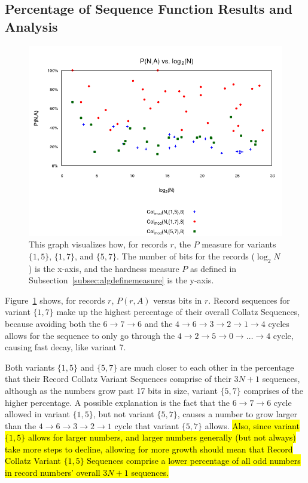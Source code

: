 \subsection{Percentage of Sequence Function Results and Analysis} \label{subsubsec:algmulpercentage}
\begin{figure}
    \centering
    \includegraphics[scale=0.6]{ModAvoidanceAnalysisPics/P_vs_log_multi_base.png}
    \caption{This graph visualizes how, for records $r$, the $P$ measure for variants $\{1,5\}$, $\{1,7\}$, and $\{5,7\}$. The number of bits for the records ($\log_2{N}$) is the x-axis, and the hardness measure $P$ as defined in Subsection~\ref{subsec:algdefinemeasure} is the y-axis.}
    \label{fig:p_multi_vslog}
\end{figure}
Figure~\ref{fig:p_multi_vslog} shows, for records $r$, $P(r,A)$ versus bits in $r$. Record sequences for variant $\{1,7\}$ make up the highest percentage of their overall Collatz Sequences, because avoiding both the $6 \rightarrow 7 \rightarrow 6$ and the $4 \rightarrow 6 \rightarrow 3 \rightarrow 2 \rightarrow 1 \rightarrow 4$ cycles allows for the sequence to only go through the $4  \rightarrow 2 \rightarrow 5 \rightarrow 0 \rightarrow \ldots \rightarrow 4$ cycle, causing fast decay, like variant 7. \par
Both variants $\{1,5\}$ and $\{5,7\}$ are much closer to each other in the percentage that their Record Collatz Variant Sequences comprise of their $3N+1$ sequences, although as the numbers grow past 17 bits in size, variant $\{5,7\}$ comprises of the higher percentage. A possible explanation is the fact that the $6 \rightarrow 7 \rightarrow 6$ cycle allowed in variant $\{1,5\}$, but not variant $\{5,7\}$, causes a number to grow larger than the $4 \rightarrow 6 \rightarrow 3 \rightarrow 2 \rightarrow 1$ cycle that variant $\{5,7\}$ allows. \hl{Also, since variant $\{1,5\}$ allows for larger numbers, and larger numbers generally (but not always) take more steps to decline, allowing for more growth should mean that Record Collatz Variant $\{1,5\}$ Sequences comprise a lower percentage of all odd numbers in record numbers' overall $3N+1$ sequences.}

